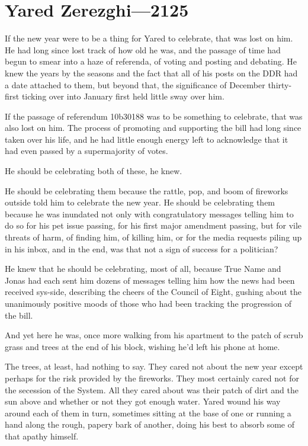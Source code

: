 \hypertarget{yared-zerezghi-2125}{%
\chapter{Yared Zerezghi---2125}\label{yared-zerezghi-2125}}

If the new year were to be a thing for Yared to celebrate, that was lost on him. He had long since lost track of how old he was, and the passage of time had begun to smear into a haze of referenda, of voting and posting and debating. He knew the years by the seasons and the fact that all of his posts on the DDR had a date attached to them, but beyond that, the significance of December thirty-first ticking over into January first held little sway over him.

If the passage of referendum 10b30188 was to be something to celebrate, that was also lost on him. The process of promoting and supporting the bill had long since taken over his life, and he had little enough energy left to acknowledge that it had even passed by a supermajority of votes.

He should be celebrating both of these, he knew.

He should be celebrating them because the rattle, pop, and boom of fireworks outside told him to celebrate the new year. He should be celebrating them because he was inundated not only with congratulatory messages telling him to do so for his pet issue passing, for his first major amendment passing, but for vile threats of harm, of finding him, of killing him, or for the media requests piling up in his inbox, and in the end, was that not a sign of success for a politician?

He knew that he should be celebrating, most of all, because True Name and Jonas had each sent him dozens of messages telling him how the news had been received sys-side, describing the cheers of the Council of Eight, gushing about the unanimously positive moods of those who had been tracking the progression of the bill.

And yet here he was, once more walking from his apartment to the patch of scrub grass and trees at the end of his block, wishing he'd left his phone at home.

The trees, at least, had nothing to say. They cared not about the new year except perhaps for the risk provided by the fireworks. They most certainly cared not for the secession of the System. All they cared about was their patch of dirt and the sun above and whether or not they got enough water. Yared wound his way around each of them in turn, sometimes sitting at the base of one or running a hand along the rough, papery bark of another, doing his best to absorb some of that apathy himself.

